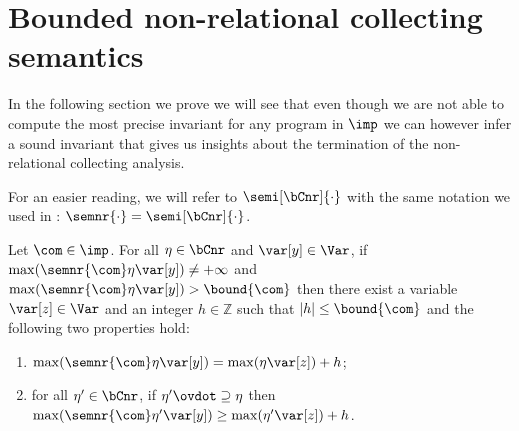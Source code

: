 \section{Bounded non-relational collecting
  semantics}\label{sec:boundingnonrel}

In the following section we prove we will see that even though we are
not able to compute the most precise invariant for any program in
\(\imp\) we can however infer a sound invariant that gives us insights
about the termination of the non-relational collecting analysis.

For an easier reading, we will refer to \(\semi[\bCnr]{\cdot}\) with
the same notation we used in :
\(\semnr{\cdot} = \semi[\bCnr]{\cdot}\).

\begin{lemma}\label{le:incnr}
  Let \(\com\in \imp\).
  For all \(\eta \in \bCnr\) and \(\var[y] \in \Var\), if
  \(\max(\semnr{\com} \eta \var[y]) \neq +\infty\) and
  \(\max(\semnr{\com}\eta \var[y]) > \bound{\com}\) then there exist a
  variable \(\var[z] \in \Var\) and an integer \(h \in \mathbb{Z}\)
  such that \(|h| \leq \bound{\com}\) and the following two properties
  hold:
  \begin{enumerate}[label=(\roman*)]
  \item\label{point1nrdef}
    \(\max(\semnr{\com}\eta \var[y]) = \max(\eta \var[z]) + h\);
  \item\label{point2nrdef} for all \(\eta' \in \bCnr\), if
    \(\eta' \ovdot\supseteq \eta\)
    then
    \(\max(\semnr{\com}\eta' \var[y]) \geq \max(\eta' \var[z]) + h\).
  \end{enumerate}
\end{lemma}

